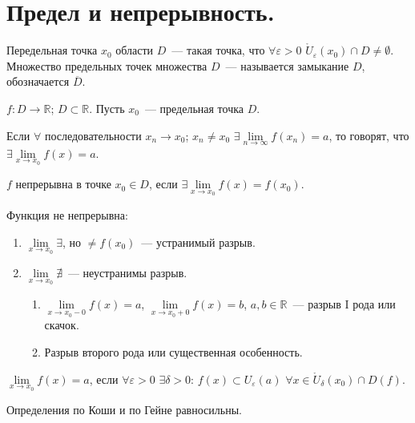 \documentclass[12pt]{article}
\begin{document}
	\section{Предел и непрерывность.}
	\begin{definition}
		Передельная точка $x_0$ области $D$~--- такая точка, что $\forall \varepsilon > 0$ $\mathring{U}_{\varepsilon}(x_0) \cap D \not= \emptyset$. Множество предельных точек множества $D$~--- называется замыкание $D$, обозначается $\overline{D}$.
	\end{definition}
	\noindent
	$f: D \rightarrow \mathbb{R}$; $D \subset \mathbb{R}$. Пусть $x_0$~--- предельная точка $D$. \\
	\begin{definition}[По Гейне]
		Если $\forall$ последовательности $x_n \rightarrow x_0$; $x_n \not= x_0$ $\exists \lim \limits_{n \rightarrow \infty} f(x_n) = a$, то говорят, что $\exists \lim \limits_{x \rightarrow x_0} f(x) = a$.
	\end{definition}
	\begin{definition}
		$f$ непрерывна в точке $x_0 \in D$, если $\exists \lim \limits_{x \rightarrow x_0} f(x) = f(x_0)$.
	\end{definition}
	\begin{note}
		Функция не непрерывна:
		\begin{enumerate}
			\item $\lim\limits_{x \rightarrow x_0} \exists$, но $\not= f(x_0)$~--- устранимый разрыв.
			\item $\lim\limits_{x \rightarrow x_0} \nexists$~--- неустранимы разрыв.
			\begin{enumerate}
				\item $\lim\limits_{x \rightarrow x_0 - 0} f(x) = a$, $\lim\limits_{x \rightarrow x_0 + 0} f(x) = b$, $a, b \in \mathbb{R}$~--- разрыв I рода или скачок.
				\item Разрыв второго рода или существенная особенность.
			\end{enumerate}
		\end{enumerate}
	\end{note}
	\begin{definition}[По Коши]
		$\lim \limits_{x \rightarrow x_0} f(x) = a$, если $\forall \varepsilon > 0$ $\exists \delta > 0$: $f(x) \subset U_{\varepsilon}(a)$ $\forall x \in \mathring{U}_{\delta}(x_0) \cap D(f)$.
	\end{definition}
	\begin{statement}
		Определения по Коши и по Гейне равносильны.
	\end{statement}
\end{document}
